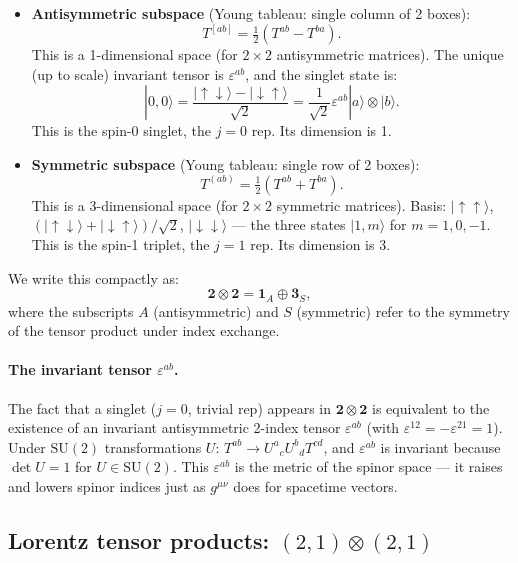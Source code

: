 \begin{itemize}
  \item \textbf{Antisymmetric subspace} (Young tableau: single column of 2 boxes):
  \[
    T^{[ab]} = \tfrac{1}{2}(T^{ab} - T^{ba}).
  \]
  This is a 1-dimensional space (for $2\times 2$ antisymmetric matrices).
  The unique (up to scale) invariant tensor is $\varepsilon^{ab}$, and the singlet state is:
  \[
    |0,0\rangle = \frac{|{\uparrow\downarrow}\rangle - |{\downarrow\uparrow}\rangle}{\sqrt{2}}
    = \frac{1}{\sqrt{2}}\varepsilon^{ab}|a\rangle\otimes|b\rangle.
  \]
  This is the spin-0 singlet, the $j=0$ rep. Its dimension is 1.

  \item \textbf{Symmetric subspace} (Young tableau: single row of 2 boxes):
  \[
    T^{(ab)} = \tfrac{1}{2}(T^{ab} + T^{ba}).
  \]
  This is a 3-dimensional space (for $2\times 2$ symmetric matrices).
  Basis: $|{\uparrow\uparrow}\rangle$,
  $(|{\uparrow\downarrow}\rangle+|{\downarrow\uparrow}\rangle)/\sqrt{2}$,
  $|{\downarrow\downarrow}\rangle$ --- the three states $|1,m\rangle$ for $m=1,0,-1$.
  This is the spin-1 triplet, the $j=1$ rep.  Its dimension is 3.
\end{itemize}

We write this compactly as:
\begin{equation}
  \mathbf{2}\otimes\mathbf{2} = \mathbf{1}_A \oplus \mathbf{3}_S,
  \label{eq:su2_22}
\end{equation}
where the subscripts $A$ (antisymmetric) and $S$ (symmetric) refer to
the symmetry of the tensor product under index exchange.

\paragraph{The invariant tensor $\varepsilon^{ab}$.}
The fact that a singlet ($j=0$, trivial rep) appears in $\mathbf{2}\otimes\mathbf{2}$
is equivalent to the existence of an invariant antisymmetric 2-index tensor
$\varepsilon^{ab}$ (with $\varepsilon^{12}=-\varepsilon^{21}=1$).
Under $\mathrm{SU}(2)$ transformations $U$: $T^{ab} \to U^a{}_c U^b{}_d T^{cd}$,
and $\varepsilon^{ab}$ is invariant because $\det U = 1$ for $U\in\mathrm{SU}(2)$.
This $\varepsilon^{ab}$ is the metric of the spinor space --- it raises and lowers
spinor indices just as $g^{\mu\nu}$ does for spacetime vectors.

\subsection{Lorentz tensor products: \texorpdfstring{$(2,1)\otimes(2,1)$}{(2,1)x(2,1)}}

